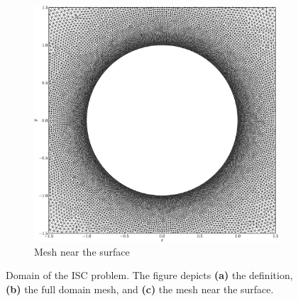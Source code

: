 \begin{figure}[p]
     \begin{subfigure}[t]{0.3\textwidth}
             \includegraphics[width=\textwidth]{figures/eulerian/ISC_mesh_surface-crop.png}
             \caption{Mesh near the surface}
             \label{fig:ISC_mesh_surface}
     \end{subfigure}

     \caption{Domain of the ISC problem. The figure depicts \textbf{(a)} the definition, \textbf{(b)} the full domain mesh, and \textbf{(c)} the mesh near the surface.}
     \label{fig:ISCDomain}
	\end{figure}

